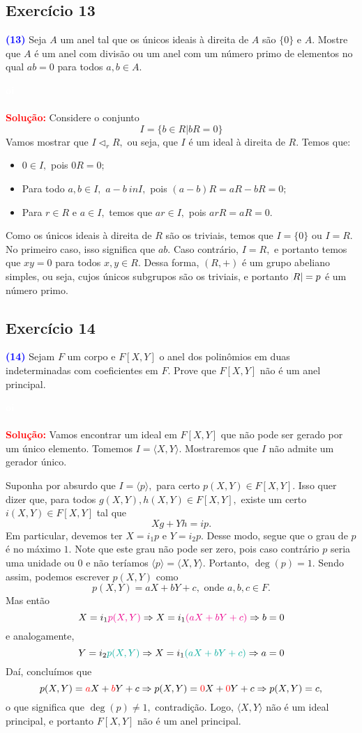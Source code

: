 \documentclass[11pt,a4paper]{article}
\newcommand{\exercicio}[1]{\subsection{Exercício #1} \textcolor{blue}{\bf(#1)}}
\newcommand{\solucao}[1]{
\textbf{\textcolor{white}{oi}\\ \\ \textcolor{red}{Solução:}} #1}
\begin{document}
\exercicio{13}  Seja $A$ um anel tal que os únicos ideais à direita de $A$ são $\{0\}$ e $A.$ Mostre que $A$ é um anel com divisão ou um anel com um número primo de elementos no qual $ab = 0$ para todos $a, b \in A.$
\solucao{ Considere o conjunto
\[
I = \{ b \in R | bR = 0 \}
\]
Vamos mostrar que $I \lhd_r R,$ ou seja, que $I$ é um ideal à direita de $R.$ Temos que:
\begin{itemize}
    \item $0 \in I,$ pois $0R = 0;$
    \item Para todo $a,b \in I,$ $a - b \ in I,$ pois $(a - b)R = aR- bR = 0;$
    \item Para $r \in R$ e $a \in I,$ temos que $ar \in I,$ pois $arR = aR = 0.$
\end{itemize}

Como os únicos ideais à direita de $R$ são os triviais, temos que $I = \{0\}$ ou $I = R.$ No primeiro caso, isso significa que $ab $. Caso contrário, $I = R,$ e portanto temos que $xy = 0$ para todos $x,y \in R.$ Dessa forma, $(R, +)$ é um grupo abeliano simples, ou seja, cujos únicos subgrupos são os triviais, e portanto $\abs{R} = p$ é um número primo.
}
\exercicio{14} Sejam $F$ um corpo e $F[X,Y]$ o anel dos polinômios em duas indeterminadas com coeficientes em $F$.
Prove que $F[X, Y]$ não é um anel principal. 
\solucao{Vamos encontrar um ideal em $F[X, Y]$ que não pode ser gerado por um único elemento. Tomemos $I = \langle X, Y \rangle.$ Mostraremos que $I$ não admite um gerador único.

Suponha por absurdo que $I = \langle p \rangle,$ para certo $p(X,Y) \in F[X,Y].$ Isso quer dizer que, para todos $g(X,Y), h(X,Y) \in F[X,Y],$ existe um certo $i(X,Y) \in F[X,Y]$ tal que
\[
Xg + Yh = ip.
\]
Em particular, devemos ter $X = i_1p$ e $Y = i_2p.$ Desse modo, segue que o grau de $p$ é no máximo $1.$ Note que este grau não pode ser zero, pois caso contrário $p$ seria uma unidade ou $0$ e não teríamos $\langle p \rangle = \langle X,Y \rangle.$ Portanto, $\deg(p) = 1.$ Sendo assim, podemos escrever $p(X,Y)$ como
\[
p(X,Y) = aX + bY + c, \mbox{ onde } a,b,c \in F.
\]
Mas então
\[
X = i_1\textcolor{Magenta}{p(X,Y)} \Rightarrow X = i_1\textcolor{Magenta}{(aX + bY + c)} \Rightarrow b = 0
\]
e analogamente, 
\[
Y = i_2\textcolor{JungleGreen}{p(X,Y)} \Rightarrow X = i_1\textcolor{JungleGreen}{(aX + bY + c)} \Rightarrow a = 0
\]
Daí, concluímos que
\[
p(X,Y) = \textcolor{red}{a}X +  \textcolor{red}{b}Y + c \Rightarrow p(X,Y) = \textcolor{red}{0}X +  \textcolor{red}{0}Y + c \Rightarrow p(X,Y) = c,
\]
o que significa que $\deg(p) \neq 1,$ contradição.
Logo, $\langle X, Y \rangle$ não é um ideal principal, e portanto $F[X,Y]$ não é um anel principal.
}
\end{document}
